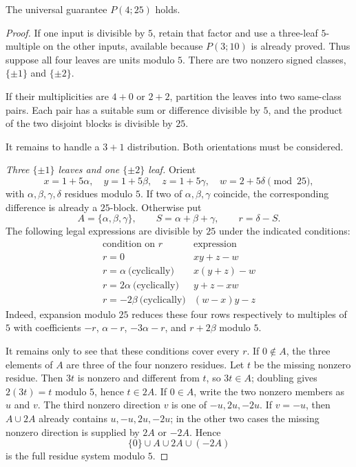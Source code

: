 \begin{theorem}\label{thm:p25}
The universal guarantee $P(4;25)$ holds.
\end{theorem}
\begin{proof}
If one input is divisible by $5$, retain that factor and use a three-leaf
$5$-multiple on the other inputs, available because $P(3;10)$ is already
proved.  Thus suppose all four leaves are units modulo $5$.  There are two
nonzero signed classes, $\{\pm1\}$ and $\{\pm2\}$.

If their multiplicities are $4+0$ or $2+2$, partition the leaves into two
same-class pairs.  Each pair has a suitable sum or difference divisible by
$5$, and the product of the two disjoint blocks is divisible by $25$.

It remains to handle a $3+1$ distribution.  Both orientations must be
considered.

\emph{Three $\{\pm1\}$ leaves and one $\{\pm2\}$ leaf.}
Orient
\[
 x=1+5\alpha,\quad y=1+5\beta,\quad z=1+5\gamma,
 \quad w=2+5\delta \pmod{25},
\]
with $\alpha,\beta,\gamma,\delta$ residues modulo $5$.  If two of
$\alpha,\beta,\gamma$ coincide, the corresponding difference is already a
$25$-block.  Otherwise put
\[
 A=\{\alpha,\beta,\gamma\},\qquad
 S=\alpha+\beta+\gamma,\qquad r=\delta-S.
\]
The following legal expressions are divisible by $25$ under the indicated
conditions:
\[
\begin{array}{c|c}
\text{condition on }r & \text{expression} \\
\hline
r=0 & xy+z-w\\
r=\alpha\ \text{(cyclically)} & x(y+z)-w\\
r=2\alpha\ \text{(cyclically)} & y+z-xw\\
r=-2\beta\ \text{(cyclically)} & (w-x)y-z
\end{array}
\]
Indeed, expansion modulo $25$ reduces these four rows respectively to
multiples of $5$ with coefficients $-r$, $\alpha-r$,
$-3\alpha-r$, and $r+2\beta$ modulo $5$.

It remains only to see that these conditions cover every $r$.  If
$0\notin A$, the three elements of $A$ are three of the four nonzero residues.
Let $t$ be the missing nonzero residue.  Then $3t$ is nonzero and different
from $t$, so $3t\in A$; doubling gives $2(3t)=t$ modulo $5$, hence
$t\in2A$.  If $0\in A$, write the two nonzero members as $u$ and $v$.  The
third nonzero direction $v$ is one of $-u,2u,-2u$.  If $v=-u$, then
$A\cup2A$ already contains $u,-u,2u,-2u$; in the other two cases the missing
nonzero direction is supplied by $2A$ or $-2A$.  Hence
\[
 \{0\}\cup A\cup2A\cup(-2A)
\]
is the full residue system modulo $5$.


\end{proof}
